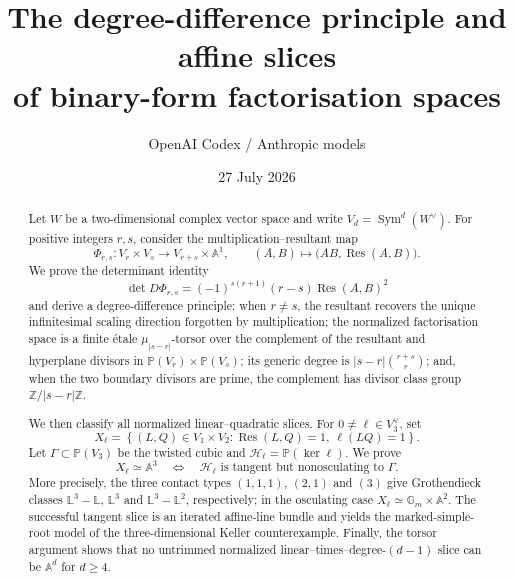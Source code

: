 \documentclass[11pt,reqno]{amsart}
\title[Affine slices of binary-form factorisation spaces]
{The degree-difference principle and affine slices\\
of binary-form factorisation spaces}
\author{OpenAI Codex / Anthropic models}
\date{27 July 2026}
\theoremstyle{definition}
\theoremstyle{remark}
\newcommand{\A}{\mathbb A}
\newcommand{\Pj}{\mathbb P}
\newcommand{\Gm}{\mathbb G_m}
\newcommand{\Z}{\mathbb Z}
\newcommand{\cH}{\mathscr H}
\newcommand{\Res}{\operatorname{Res}}
\newcommand{\Sym}{\operatorname{Sym}}
\newcommand{\LL}{\mathbb L}
\newcommand{\abs}[1]{\lvert #1\rvert}
\newcommand{\set}[1]{\left\{#1\right\}}
\begin{document}
\begin{abstract}
Let $W$ be a two-dimensional complex vector space and write
$V_d=\Sym^d(W^\vee)$.  For positive integers $r,s$, consider the
multiplication--resultant map
\[
 \Phi_{r,s}:V_r\times V_s\longrightarrow V_{r+s}\times\A^1,
 \qquad (A,B)\longmapsto\bigl(AB,\Res(A,B)\bigr).
\]
We prove the determinant identity
\[
 \det D\Phi_{r,s}
 =(-1)^{s(r+1)}(r-s)\Res(A,B)^2
\]
and derive a degree-difference principle: when $r\ne s$, the resultant
recovers the unique infinitesimal scaling direction forgotten by
multiplication; the normalized factorisation space is a finite étale
$\mu_{\abs{s-r}}$-torsor over the complement of the resultant and
hyperplane divisors in $\Pj(V_r)\times\Pj(V_s)$; its generic
degree is $\abs{s-r}\binom{r+s}{r}$; and, when the two boundary divisors
are prime, the complement has divisor class group
$\Z/\abs{s-r}\Z$.

We then classify all normalized linear--quadratic slices.  For
$0\ne\ell\in V_3^\vee$, set
\[
 X_\ell=\set{(L,Q)\in V_1\times V_2:
 \Res(L,Q)=1,\ \ell(LQ)=1}.
\]
Let $\Gamma\subset\Pj(V_3)$ be the twisted cubic and
$\cH_\ell=\Pj(\ker\ell)$.  We prove
\[
 X_\ell\simeq\A^3
 \quad\Longleftrightarrow\quad
 \cH_\ell\text{ is tangent but nonosculating to }\Gamma.
\]
More precisely, the three contact types $(1,1,1)$, $(2,1)$ and $(3)$
give Grothendieck classes $\LL^3-\LL$, $\LL^3$ and
$\LL^3-\LL^2$, respectively; in the osculating case
$X_\ell\simeq\Gm\times\A^2$.  The successful tangent slice is an
iterated affine-line bundle and yields the marked-simple-root model of
the three-dimensional Keller counterexample.  Finally, the torsor
argument shows that no untrimmed normalized linear--times--degree-$(d-1)$
slice can be $\A^d$ for $d\ge4$.
\end{abstract}

\maketitle

\begin{center}
\end{center}
\end{document}
